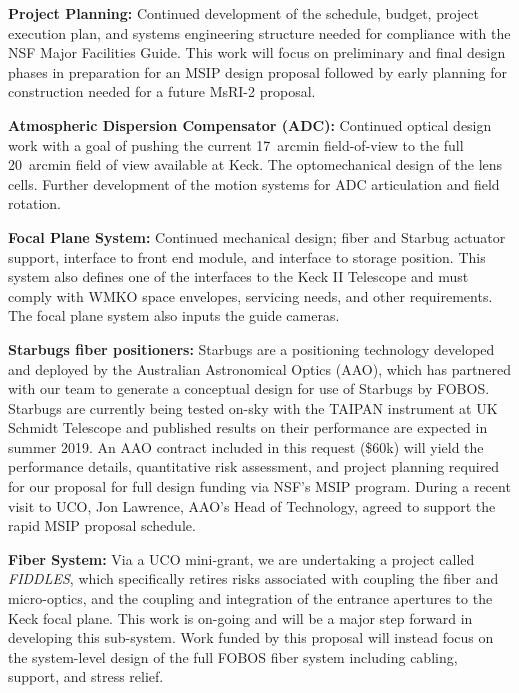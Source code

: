 \noindent \textbf{Project Planning:} Continued development of the
schedule, budget, project execution plan, and systems engineering
structure needed for compliance with the NSF Major Facilities Guide.
This work will focus on preliminary and final design phases in
preparation for an MSIP design proposal followed by early planning for
construction needed for a future MsRI-2 proposal. 

\noindent \textbf{Atmospheric Dispersion Compensator (ADC):} Continued
optical design work with a goal of pushing the current 17~arcmin field-of-view
to the full 20~arcmin field of view available at Keck.  The
optomechanical design of the lens cells.  Further development of the
motion systems for ADC articulation and field rotation.

\noindent \textbf{Focal Plane System:} Continued mechanical design;
fiber and Starbug actuator support, interface to front end module, and
interface to storage position. This system also defines one of the
interfaces to the Keck II Telescope and must comply with WMKO space
envelopes, servicing needs, and other requirements. The focal plane
system also inputs the guide cameras. 

\noindent \textbf{Starbugs fiber positioners:} Starbugs are a
positioning technology developed and deployed by the Australian
Astronomical Optics (AAO), which has partnered with our team to
generate a conceptual design for use of Starbugs by FOBOS. Starbugs
are currently being tested on-sky with the TAIPAN instrument at UK
Schmidt Telescope and published results on their performance are
expected in summer 2019. An AAO contract included in this request
(\$60k) will yield the performance details, quantitative risk
assessment, and project planning required for our proposal for full
design funding via NSF's MSIP program. During a recent visit to UCO,
Jon Lawrence, AAO's Head of Technology, agreed to support the rapid
MSIP proposal schedule.

\noindent \textbf{Fiber System:} Via a UCO mini-grant, we are
undertaking a project called {\it FIDDLES}, which specifically
retires risks associated with coupling the fiber and micro-optics,
and the coupling and integration of the entrance apertures to the
Keck focal plane. This work is on-going and will be a major step
forward in developing this sub-system. Work funded by this proposal
will instead focus on the system-level design of the full FOBOS fiber
system including cabling, support, and stress relief.


